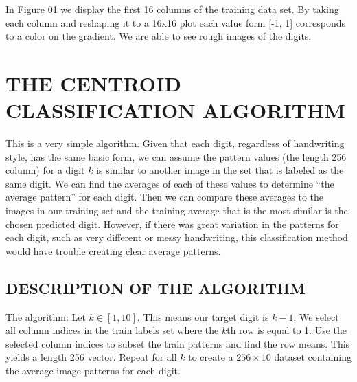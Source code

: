 \documentclass[dvipsnames,12pt]{article} %
\begin{document}
      \vspace{06pt}

In Figure 01 we display the first 16 columns of the training data set. By taking each column and reshaping it to a 16x16 plot each value form [-1, 1] corresponds to a color on the gradient. We are able to see rough images of the digits.

  \section{THE CENTROID CLASSIFICATION ALGORITHM}
    \label{SECT 03:THE CENTROID ALGORITHM}

      \vspace{06pt}
This is a very simple algorithm. Given that each digit, regardless of handwriting style, has the same basic form, we can assume the pattern values (the length 256 column) for a digit $k$ is similar to another image in the set that is labeled as the same digit. We can find the averages of each of these values to determine “the average pattern” for each digit. Then we can compare these averages to the images in our training set and the training average that is the most similar is the chosen predicted digit.  However, if there was great variation in the patterns for each digit, such as very different or messy handwriting, this classification method would have trouble creating clear average patterns.
      
      \subsection{DESCRIPTION OF THE ALGORITHM}
        \label{SUBSECT 3.1:CENTROID DESCRIPTION}

The algorithm: Let $k \in [1,10]$. This means our target digit is $k-1$. We select all column indices in the train labels set where the $k$th row is equal to 1. Use the selected column indices to subset the train patterns and find the row means. This yields a length 256 vector. Repeat for all $k$ to create a $256\times10$ dataset containing the average image patterns for each digit.

        
          \vspace{06pt}
\end{document}
